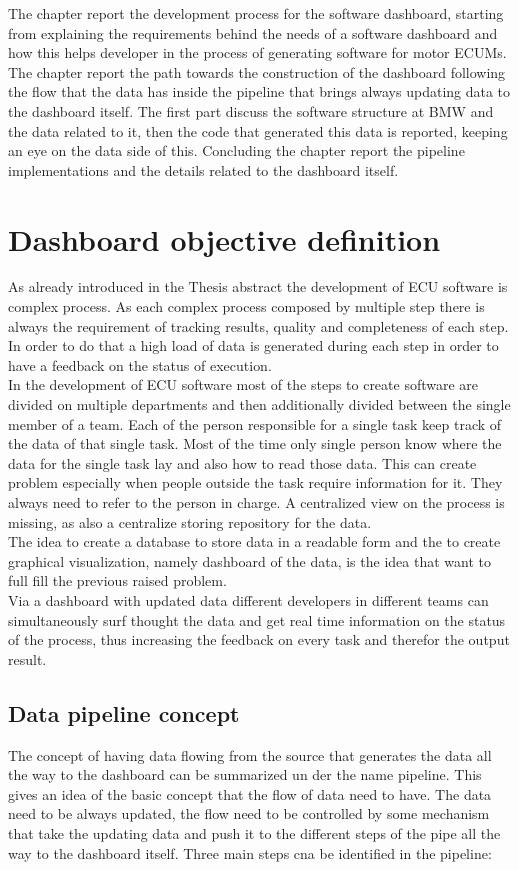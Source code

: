 \documentclass[../main.tex]{subfiles}
\begin{document}
The chapter report the development process for the software dashboard, starting from explaining the requirements behind the needs of a software dashboard and how this helps developer in the process of generating software for motor \gls{ECUM}s. The chapter report the path towards the construction of the dashboard following the flow that the data has inside the pipeline that brings always updating data to the dashboard itself. The first part discuss the software structure at \gls{BMW} and the data related to it, then the code that generated this data is reported, keeping an eye on the data side of this. Concluding the chapter report the pipeline implementations and the details related to the dashboard itself.
\section{Dashboard objective definition}
As already introduced in the Thesis abstract the development of \gls{ECU} software is complex process. As each complex process composed by multiple step there is always the requirement of tracking results, quality and completeness of each step. In order to do that a high load of data is generated during each step in order to have a feedback on the status of execution.\\
In the development of \gls{ECU} software most of the steps to create software are divided on multiple departments and then additionally divided between the single member of a team. Each of the person responsible for a single task keep track of the data of that single task. Most of the time only single person know where the data for the single task lay and also how to read those data. This can create problem especially when people outside the task require information for it. They always need to refer to the person in charge. A centralized view on the process is missing, as also a centralize storing repository for the data. \\
The idea to create a database to store data in a readable form and the to create graphical visualization, namely dashboard of the data, is the idea that want to full fill the previous raised problem.\\
Via a dashboard with updated data different developers in different teams can simultaneously surf thought the data and get real time information on the status of the process, thus increasing the feedback on every task and therefor the output result.
\subsection{Data pipeline concept}
The concept of having data flowing from the source that generates the data all the way to the dashboard can be summarized un der the name pipeline. This gives an idea of the basic concept that the flow of data need to have. The data need to be always updated, the flow need to be controlled by some mechanism that take the updating data and push it to the different steps of the pipe all the way to the dashboard itself. Three main steps cna be identified in the pipeline:
\end{document}

